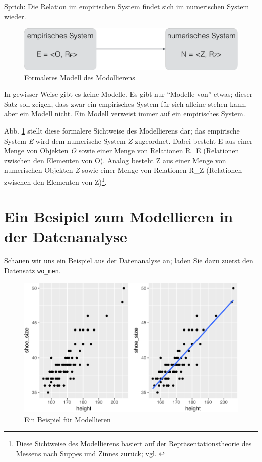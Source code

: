 \documentclass[12pt,ngerman,]{book}
\let\rmarkdownfootnote\footnote%
\def\footnote{\protect\rmarkdownfootnote}
\begin{document}
Sprich: Die Relation im empirischen System findet sich im numerischen
System wieder.

\begin{figure}

{\centering \includegraphics[width=0.7\linewidth]{images/modellieren/Modellieren_formal_crop} 

}

\caption{Formaleres Modell des Modollierens}\label{fig:modellieren-formal}
\end{figure}

In gewisser Weise gibt es keine Modelle. Es gibt nur ``Modelle von''
etwas; dieser Satz soll zeigen, dass zwar ein empirisches System für
sich alleine stehen kann, aber ein Modell nicht. Ein Modell verweist
immer auf ein empirisches System.

Abb. \ref{fig:modellieren-formal} stellt diese formalere Sichtweise des
Modellierens dar; das empirische System \emph{E} wird dem numerische
System \emph{Z} zugeordnet. Dabei besteht E aus einer Menge von Objekten
\emph{O} sowie einer Menge von Relationen R\_E (Relationen zwischen den
Elementen von O). Analog besteht Z aus einer Menge von numerischen
Objekten \emph{Z} sowie einer Menge von Relationen R\_Z (Relationen
zwischen den Elementen von Z)\footnote{Diese Sichtweise des Modellierens
  basiert auf der Repräsentationstheorie des Messens nach Suppes und
  Zinnes \citeyearpar{suppes1962basic} zurück; vgl.
  \citet{gigerenzer1980}}.

\section{Ein Besipiel zum Modellieren in der
Datenanalyse}\label{ein-besipiel-zum-modellieren-in-der-datenanalyse}

Schauen wir uns ein Beispiel aus der Datenanalyse an; laden Sie dazu
zuerst den Datensatz \texttt{wo\_men}.

\begin{figure}

{\centering \includegraphics[width=0.9\linewidth]{060_Modellieren_files/figure-latex/plot-women-1} 

}

\caption{Ein Beispiel für Modellieren}\label{fig:plot-women}
\end{figure}
\end{document}
